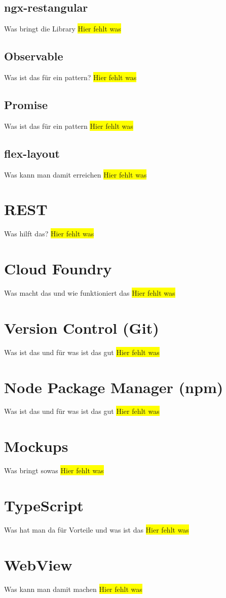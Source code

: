 \subsection{ngx-restangular}
Was bringt die Library
\colorbox{yellow}{Hier fehlt was}

\subsection{Observable}
Was ist das für ein pattern?
\colorbox{yellow}{Hier fehlt was}

\subsection{Promise}
Was ist das für ein pattern
\colorbox{yellow}{Hier fehlt was}

\subsection{flex-layout}
Was kann man damit erreichen
\colorbox{yellow}{Hier fehlt was}

\section{REST}
Was hilft das?
\colorbox{yellow}{Hier fehlt was}

\section{Cloud Foundry}
Was macht das und wie funktioniert das
\colorbox{yellow}{Hier fehlt was}

\section{Version Control (Git)}
Was ist das und für was ist das gut
\colorbox{yellow}{Hier fehlt was}

\section{Node Package Manager (npm)}
Was ist das und für was ist das gut
\colorbox{yellow}{Hier fehlt was}

\section{Mockups}
Was bringt sowas
\colorbox{yellow}{Hier fehlt was}

\section{TypeScript}
Was hat man da für Vorteile und was ist das
\colorbox{yellow}{Hier fehlt was}

\section{WebView}
Was kann man damit machen
\colorbox{yellow}{Hier fehlt was}